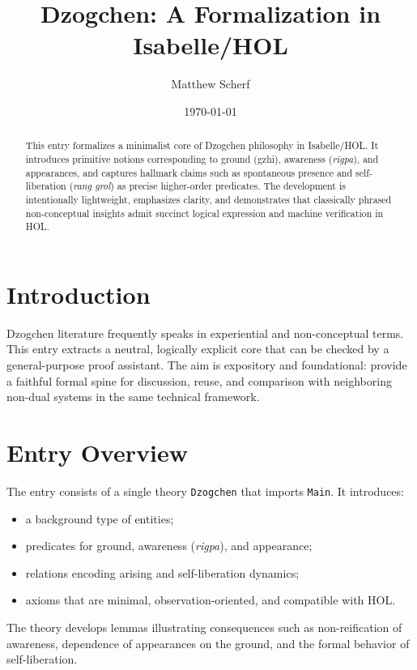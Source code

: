 \documentclass[11pt,a4paper]{article}
\title{Dzogchen: A Formalization in Isabelle/HOL}
\author{Matthew Scherf}
\date{\today}
\begin{document}
\maketitle

\begin{abstract}
This entry formalizes a minimalist core of Dzogchen philosophy in Isabelle/HOL.
It introduces primitive notions corresponding to ground (gzhi), awareness
(\emph{rigpa}), and appearances, and captures hallmark claims such as
spontaneous presence and self-liberation (\emph{rang grol}) as precise higher-order
predicates. The development is intentionally lightweight, emphasizes clarity,
and demonstrates that classically phrased non-conceptual insights admit
succinct logical expression and machine verification in HOL.
\end{abstract}

\tableofcontents
\bigskip

\section{Introduction}

Dzogchen literature frequently speaks in experiential and non-conceptual terms.
This entry extracts a neutral, logically explicit core that can be checked by a
general-purpose proof assistant. The aim is expository and foundational:
provide a faithful formal spine for discussion, reuse, and comparison with
neighboring non-dual systems in the same technical framework.

\section{Entry Overview}

The entry consists of a single theory \texttt{Dzogchen} that imports
\texttt{Main}. It introduces:
\begin{itemize}
  \item a background type of entities;
  \item predicates for ground, awareness (\emph{rigpa}), and appearance;
  \item relations encoding arising and self-liberation dynamics;
  \item axioms that are minimal, observation-oriented, and compatible with HOL.
\end{itemize}
The theory develops lemmas illustrating consequences such as non-reification of
awareness, dependence of appearances on the ground, and the formal behavior of
self-liberation.
\end{document}

